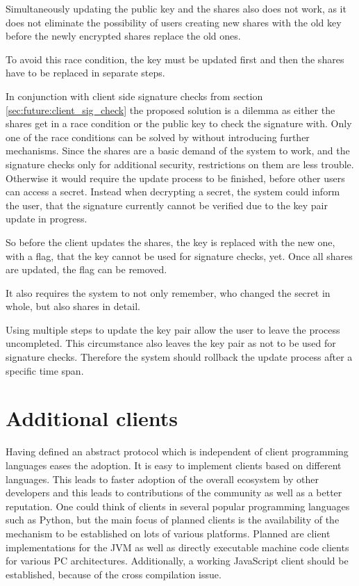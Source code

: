 Simultaneously updating the public key and the shares also does not work, as it
does not eliminate the possibility of users creating new shares with the old key
before the newly encrypted shares replace the old ones.

To avoid this race condition, the key must be updated first and then the shares
have to be replaced in separate steps.

In conjunction with client side signature checks from section
\ref{sec:future:client_sig_check} the proposed solution is a dilemma as either
the shares get in a race condition or the public key to check the signature
with. Only one of the race conditions can be solved by without introducing
further mechanisms. Since the shares are a basic demand of the system to work,
and the signature checks only for additional security, restrictions on them are
less trouble. Otherwise it would require the update process to be finished,
before other users can access a secret. Instead when decrypting a secret, the
system could inform the user, that the signature currently cannot be verified
due to the key pair update in progress.

So before the client updates the shares, the key is replaced with the new one,
with a flag, that the key cannot be used for signature checks, yet. Once all
shares are updated, the flag can be removed.

It also requires the system to not only remember, who changed the secret in
whole, but also shares in detail.

Using multiple steps to update the key pair allow the user to leave the process
uncompleted. This circumstance also leaves the key pair as not to be used for
signature checks. Therefore the system should rollback the update process after
a specific time span.

\section{Additional clients}

Having defined an abstract protocol which is independent of client programming
languages eases the adoption.  It is easy to implement clients based on
different languages. This leads to faster adoption of the overall ecosystem by
other developers and this leads to contributions of the community as well as a
better reputation. One could think of clients in several popular programming
languages such as Python, but the main focus of planned clients is the
availability of the mechanism to be established on lots of various platforms.
Planned are client implementations for the JVM as well as directly executable
machine code clients for various PC architectures. Additionally, a working
JavaScript client should be established, because of the cross compilation issue.

